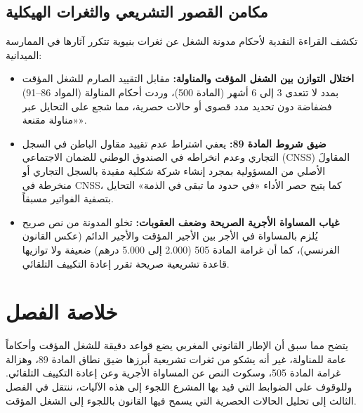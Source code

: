 \subsection{مكامن القصور التشريعي والثغرات الهيكلية}
تكشف القراءة النقدية لأحكام مدونة الشغل عن ثغرات بنيوية تتكرر آثارها في الممارسة الميدانية:
\begin{itemize}[leftmargin=*, itemsep=5pt]
    \item \textbf{اختلال التوازن بين الشغل المؤقت والمناولة:} مقابل التقييد الصارم للشغل المؤقت بمدد لا تتعدى \textenglish{3} إلى \textenglish{6} أشهر (المادة \textenglish{500})، وردت أحكام المناولة (المواد \textenglish{86}--\textenglish{91}) فضفاضة دون تحديد مدد قصوى أو حالات حصرية، مما شجع على التحايل عبر «مناولة مقنعة».
    \item \textbf{ضيق شروط المادة \textenglish{89}:} يعفي اشتراط عدم تقييد مقاول الباطن في السجل التجاري وعدم انخراطه في الصندوق الوطني للضمان الاجتماعي (\textenglish{CNSS}) المقاولَ الأصلي من المسؤولية بمجرد إنشاء شركة شكلية مقيدة بالسجل التجاري أو منخرطة في \textenglish{CNSS}، كما يتيح حصر الأداء «في حدود ما تبقى في الذمة» التحايل بتصفية الفواتير مسبقاً.
    \item \textbf{غياب المساواة الأجرية الصريحة وضعف العقوبات:} تخلو المدونة من نص صريح يُلزم بالمساواة في الأجر بين الأجير المؤقت والأجير الدائم (عكس القانون الفرنسي)، كما أن غرامة المادة \textenglish{505} (\textenglish{2.000} إلى \textenglish{5.000} درهم) ضعيفة ولا توازيها قاعدة تشريعية صريحة تقرر إعادة التكييف التلقائي.
\end{itemize}

\section*{خلاصة الفصل}

يتضح مما سبق أن الإطار القانوني المغربي يضع قواعد دقيقة للشغل المؤقت وأحكاماً عامة للمناولة، غير أنه يشكو من ثغرات تشريعية أبرزها ضيق نطاق المادة \textenglish{89}، وهزالة غرامة المادة \textenglish{505}، وسكوت النص عن المساواة الأجرية وعن إعادة التكييف التلقائي. وللوقوف على الضوابط التي قيد بها المشرع اللجوء إلى هذه الآليات، ننتقل في الفصل الثالث إلى تحليل الحالات الحصرية التي يسمح فيها القانون باللجوء إلى الشغل المؤقت.
